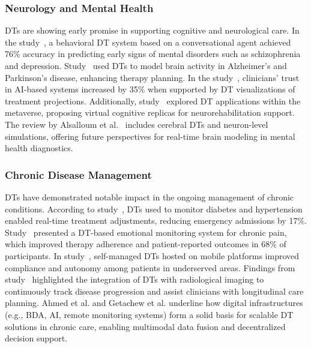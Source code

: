 \documentclass[10pt,a4paper]{article}
\begin{document}
\subsubsection*{Neurology and Mental Health}
DTs are showing early promise in supporting cognitive and neurological care.  
In the study~\cite{Abilkaiyrkyzy2024}, a behavioral DT system based on a conversational agent achieved 76\% accuracy in predicting early signs of mental disorders such as schizophrenia and depression.  
Study~\cite{Fekonja2024} used DTs to model brain activity in Alzheimer’s and Parkinson’s disease, enhancing therapy planning.  
In the study~\cite{Vidovszky2024}, clinicians’ trust in AI-based systems increased by 35\% when supported by DT visualizations of treatment projections.  
Additionally, study~\cite{Siva Sai2024} explored DT applications within the metaverse, proposing virtual cognitive replicas for neurorehabilitation support.  
The review by Alsalloum et al.~\cite{Alsalloum2024} includes cerebral DTs and neuron-level simulations, offering future perspectives for real-time brain modeling in mental health diagnostics.

\subsubsection*{Chronic Disease Management}
DTs have demonstrated notable impact in the ongoing management of chronic conditions.  
According to study~\cite{Venkatesh2024}, DTs used to monitor diabetes and hypertension enabled real-time treatment adjustments, reducing emergency admissions by 17\%.  
Study~\cite{Tao2019} presented a DT-based emotional monitoring system for chronic pain, which improved therapy adherence and patient-reported outcomes in 68\% of participants.  
In study~\cite{Stephanie2024}, self-managed DTs hosted on mobile platforms improved compliance and autonomy among patients in underserved areas.  
Findings from study~\cite{Panayides2020} highlighted the integration of DTs with radiological imaging to continuously track disease progression and assist clinicians with longitudinal care planning.  
Ahmed et al.\cite{Ahmed2023} and Getachew et al.\cite{Getachew2024} underline how digital infrastructures (e.g., BDA, AI, remote monitoring systems) form a solid basis for scalable DT solutions in chronic care, enabling multimodal data fusion and decentralized decision support.
\end{document}

